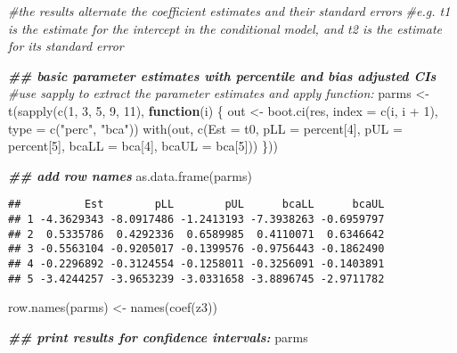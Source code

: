 \documentclass[
]{article}
\newenvironment{Shaded}{\begin{snugshade}}{\end{snugshade}}
\newcommand{\AttributeTok}[1]{\textcolor[rgb]{0.77,0.63,0.00}{#1}}
\newcommand{\CommentTok}[1]{\textcolor[rgb]{0.56,0.35,0.01}{\textit{#1}}}
\newcommand{\ControlFlowTok}[1]{\textcolor[rgb]{0.13,0.29,0.53}{\textbf{#1}}}
\newcommand{\DecValTok}[1]{\textcolor[rgb]{0.00,0.00,0.81}{#1}}
\newcommand{\DocumentationTok}[1]{\textcolor[rgb]{0.56,0.35,0.01}{\textbf{\textit{#1}}}}
\newcommand{\FunctionTok}[1]{\textcolor[rgb]{0.00,0.00,0.00}{#1}}
\newcommand{\NormalTok}[1]{#1}
\newcommand{\OtherTok}[1]{\textcolor[rgb]{0.56,0.35,0.01}{#1}}
\newcommand{\SpecialCharTok}[1]{\textcolor[rgb]{0.00,0.00,0.00}{#1}}
\newcommand{\StringTok}[1]{\textcolor[rgb]{0.31,0.60,0.02}{#1}}
\begin{document}
\begin{Shaded}
\begin{Highlighting}[]
\CommentTok{\#the results alternate the coefficient estimates and their standard errors}
\CommentTok{\#e.g. t1 is the estimate for the intercept in the conditional model, and t2 is the estimate for its standard error}
\end{Highlighting}
\end{Shaded}

\begin{Shaded}
\begin{Highlighting}[]
\DocumentationTok{\#\# basic parameter estimates with percentile and bias adjusted CIs}
\CommentTok{\#use sapply to extract the parameter estimates and apply function:}
\NormalTok{parms }\OtherTok{\textless{}{-}} \FunctionTok{t}\NormalTok{(}\FunctionTok{sapply}\NormalTok{(}\FunctionTok{c}\NormalTok{(}\DecValTok{1}\NormalTok{, }\DecValTok{3}\NormalTok{, }\DecValTok{5}\NormalTok{, }\DecValTok{9}\NormalTok{, }\DecValTok{11}\NormalTok{), }\ControlFlowTok{function}\NormalTok{(i) \{}
\NormalTok{  out }\OtherTok{\textless{}{-}} \FunctionTok{boot.ci}\NormalTok{(res, }\AttributeTok{index =} \FunctionTok{c}\NormalTok{(i, i }\SpecialCharTok{+} \DecValTok{1}\NormalTok{), }\AttributeTok{type =} \FunctionTok{c}\NormalTok{(}\StringTok{"perc"}\NormalTok{, }\StringTok{"bca"}\NormalTok{))}
  \FunctionTok{with}\NormalTok{(out, }\FunctionTok{c}\NormalTok{(}\AttributeTok{Est =}\NormalTok{ t0, }\AttributeTok{pLL =}\NormalTok{ percent[}\DecValTok{4}\NormalTok{], }\AttributeTok{pUL =}\NormalTok{ percent[}\DecValTok{5}\NormalTok{],}
              \AttributeTok{bcaLL =}\NormalTok{ bca[}\DecValTok{4}\NormalTok{], }\AttributeTok{bcaUL =}\NormalTok{ bca[}\DecValTok{5}\NormalTok{]))}
\NormalTok{\}))}

\DocumentationTok{\#\# add row names}
\FunctionTok{as.data.frame}\NormalTok{(parms)}
\end{Highlighting}
\end{Shaded}

\begin{verbatim}
##          Est        pLL        pUL      bcaLL      bcaUL
## 1 -4.3629343 -8.0917486 -1.2413193 -7.3938263 -0.6959797
## 2  0.5335786  0.4292336  0.6589985  0.4110071  0.6346642
## 3 -0.5563104 -0.9205017 -0.1399576 -0.9756443 -0.1862490
## 4 -0.2296892 -0.3124554 -0.1258011 -0.3256091 -0.1403891
## 5 -3.4244257 -3.9653239 -3.0331658 -3.8896745 -2.9711782
\end{verbatim}

\begin{Shaded}
\begin{Highlighting}[]
\FunctionTok{row.names}\NormalTok{(parms) }\OtherTok{\textless{}{-}} \FunctionTok{names}\NormalTok{(}\FunctionTok{coef}\NormalTok{(z3))}

\DocumentationTok{\#\# print results for confidence intervals:}
\NormalTok{parms}
\end{Highlighting}
\end{Shaded}
\end{document}
